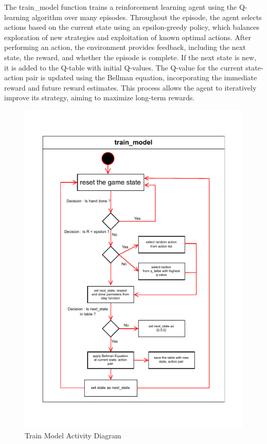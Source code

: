 \documentclass[a4paper,12pt]{report}
\begin{document}
The train\_model function trains a reinforcement learning agent using the Q-learning algorithm over many episodes. Throughout the episode, the agent selects actions based on the current state using an epsilon-greedy policy, which balances exploration of new strategies and exploitation of known optimal actions. After performing an action, the environment provides feedback, including the next state, the reward, and whether the episode is complete. If the next state is new, it is added to the Q-table with initial Q-values. The Q-value for the current state-action pair is updated using the Bellman equation, incorporating the immediate reward and future reward estimates. This process allows the agent to iteratively improve its strategy, aiming to maximize long-term rewards.

\begin{figure}[htb]
\begin{center}
\includegraphics[scale=1.2,keepaspectratio]{figures/train_model_activitydiagram.pdf}
\end{center}
\caption{Train Model Activity Diagram}
\label{fig:train_model_activitydiagram}
\end{figure}
\end{document}
